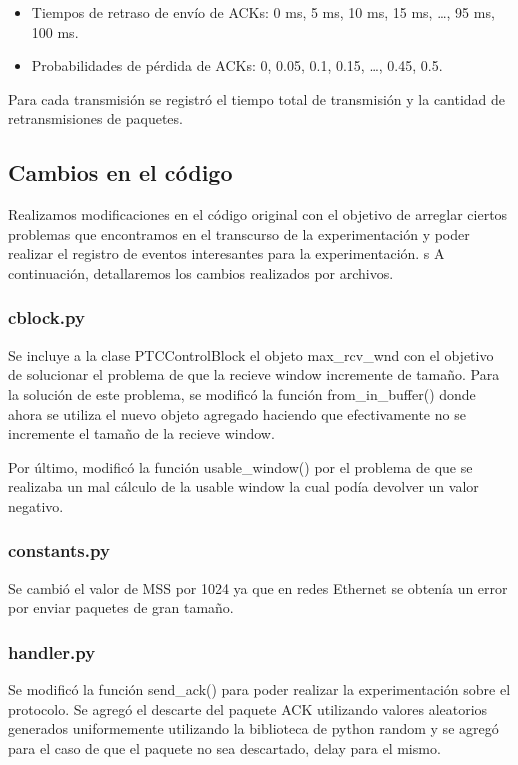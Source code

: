 \documentclass[a4paper, 10pt, twoside]{article}
\begin{document}
\begin{itemize}
  \item Tiempos de retraso de envío de ACKs:  0 ms, 5 ms, 10 ms, 15 ms, \ldots, 95 ms, 100 ms.
  \item Probabilidades de pérdida de ACKs: 0, 0.05, 0.1, 0.15, \ldots, 0.45, 0.5.
\end{itemize}

Para cada transmisión se registró el tiempo total de transmisión y la cantidad de retransmisiones de paquetes.






\subsection{Cambios en el código}
Realizamos modificaciones en el código original con el objetivo de arreglar ciertos problemas que encontramos en el transcurso de la experimentación y poder realizar
el registro de eventos interesantes para la experimentación.
s
A continuación, detallaremos los cambios realizados por archivos.

\subsubsection{cblock.py}
Se incluye a la clase PTCControlBlock el objeto max\_rcv\_wnd con el objetivo de solucionar el problema de que la recieve window incremente de tamaño. Para la solución de este problema, se modificó la función from\_in\_buffer() donde ahora se utiliza el nuevo objeto agregado haciendo que efectivamente no se incremente el tamaño de la recieve window.

Por último, modificó la función usable\_window() por el problema de que se realizaba un mal cálculo de la usable window la cual podía devolver un valor negativo.

\subsubsection{constants.py}
Se cambió el valor de MSS por 1024 ya que en redes Ethernet se obtenía un error por enviar paquetes de gran tamaño.

\subsubsection{handler.py}
Se modificó la función send\_ack() para poder realizar la experimentación sobre el protocolo. Se agregó el descarte del paquete ACK utilizando valores aleatorios generados uniformemente utilizando la biblioteca de python random y se agregó para el caso de que el paquete no sea descartado, delay para el mismo.
\end{document}
